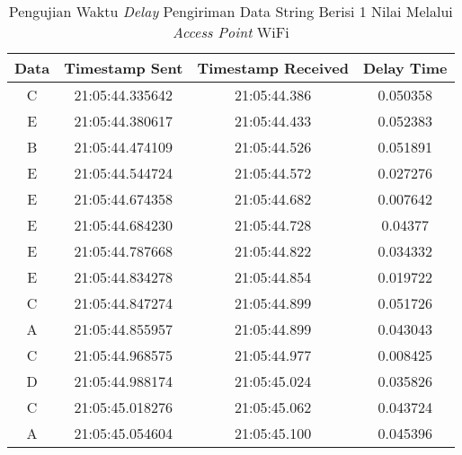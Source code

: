 \begin{longtable}{|ccc|c|}
  \caption{Pengujian Waktu \emph{Delay} Pengiriman Data String Berisi 1 Nilai Melalui \emph{Access Point} WiFi}
  \label{tbl:delayWiFi1}\\
    \hline
    \multicolumn{1}{|c|}{Data} & \multicolumn{1}{c|}{Timestamp Sent}  & Timestamp Received & Delay Time    \\ \hline
    \endfirsthead
    \endhead
    \multicolumn{1}{|c|}{C}    & \multicolumn{1}{c|}{21:05:44.335642} & 21:05:44.386       & 0.050358      \\ \hline
    \multicolumn{1}{|c|}{E}    & \multicolumn{1}{c|}{21:05:44.380617} & 21:05:44.433       & 0.052383      \\ \hline
    \multicolumn{1}{|c|}{B}    & \multicolumn{1}{c|}{21:05:44.474109} & 21:05:44.526       & 0.051891      \\ \hline
    \multicolumn{1}{|c|}{E}    & \multicolumn{1}{c|}{21:05:44.544724} & 21:05:44.572       & 0.027276      \\ \hline
    \multicolumn{1}{|c|}{E}    & \multicolumn{1}{c|}{21:05:44.674358} & 21:05:44.682       & 0.007642      \\ \hline
    \multicolumn{1}{|c|}{E}    & \multicolumn{1}{c|}{21:05:44.684230} & 21:05:44.728       & 0.04377       \\ \hline
    \multicolumn{1}{|c|}{E}    & \multicolumn{1}{c|}{21:05:44.787668} & 21:05:44.822       & 0.034332      \\ \hline
    \multicolumn{1}{|c|}{E}    & \multicolumn{1}{c|}{21:05:44.834278} & 21:05:44.854       & 0.019722      \\ \hline
    \multicolumn{1}{|c|}{C}    & \multicolumn{1}{c|}{21:05:44.847274} & 21:05:44.899       & 0.051726      \\ \hline
    \multicolumn{1}{|c|}{A}    & \multicolumn{1}{c|}{21:05:44.855957} & 21:05:44.899       & 0.043043      \\ \hline
    \multicolumn{1}{|c|}{C}    & \multicolumn{1}{c|}{21:05:44.968575} & 21:05:44.977       & 0.008425      \\ \hline
    \multicolumn{1}{|c|}{D}    & \multicolumn{1}{c|}{21:05:44.988174} & 21:05:45.024       & 0.035826      \\ \hline
    \multicolumn{1}{|c|}{C}    & \multicolumn{1}{c|}{21:05:45.018276} & 21:05:45.062       & 0.043724      \\ \hline
    \multicolumn{1}{|c|}{A}    & \multicolumn{1}{c|}{21:05:45.054604} & 21:05:45.100       & 0.045396      \\ \hline

\end{longtable}
